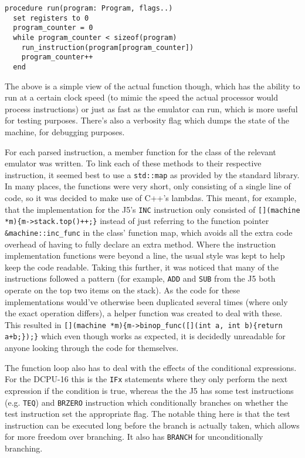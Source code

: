 \begin{lstlisting}[caption={Running a DCPU-16 program}]
procedure run(program: Program, flags..)
  set registers to 0
  program_counter = 0
  while program_counter < sizeof(program)
    run_instruction(program[program_counter])
    program_counter++
  end
\end{lstlisting}

The above is a simple view of the actual function though, which has the ability
to run at a certain clock speed (to mimic the speed the actual processor would
process instructions) or just as fast as the emulator can run, which is more
useful for testing purposes. There's also a verbosity flag which dumps the state
of the machine, for debugging purposes.

For each parsed instruction, a member function for the class of the relevant
emulator was written. To link each of these methods to their respective
instruction, it seemed best to use a \texttt{std::map} as provided by the
standard library. In many places, the functions were very short, only consisting
of a single line of code, so it was decided to make use of C++'s lambdas. This
meant, for example, that the implementation for the J5's \texttt{INC}
instruction only consisted of
\verb|[](machine *m){m->stack.top()++;}| instead of just referring to the
function pointer \verb|&machine::inc_func| in the class' function map, which
avoids all the extra code overhead of having to fully declare an extra method.
Where the instruction implementation functions were beyond a line, the usual
style was kept to help keep the code readable. Taking this further, it was
noticed that many of the instructions followed a pattern (for example,
\texttt{ADD} and \texttt{SUB} from the J5 both operate on the top two items on
the stack). As the code for these implementations would've otherwise been
duplicated several times (where only the exact operation differs), a helper
function was created to deal with these. This resulted in
\verb|[](machine *m){m->binop_func([](int a, int b){return a+b;});}| which even
though works as expected, it is decidedly unreadable for anyone looking through
the code for themselves.

The function loop also has to deal with the effects of the conditional
expressions. For the DCPU-16 this is the \lstinline{IFx} statements where they
only perform the next expression if the condition is true, whereas the the J5
has some test instructions (e.g. \lstinline{TEQ}) and \lstinline{BRZERO}
instruction which conditionally branches on whether the test instruction set the
appropriate flag. The notable thing here is that the test instruction can be
executed long before the branch is actually taken, which allows for more freedom
over branching. It also has \lstinline{BRANCH} for unconditionally branching.

